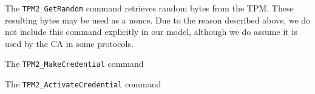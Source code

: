 The \verb|TPM2_GetRandom| command retrieves random bytes from the TPM. These resulting bytes may be used as a nonce. Due to the reason described above, we do not include this command explicitly in our model, although we do assume it is used by the CA in some protocols. 


The \verb|TPM2_MakeCredential| command

The \verb|TPM2_ActivateCredential| command




